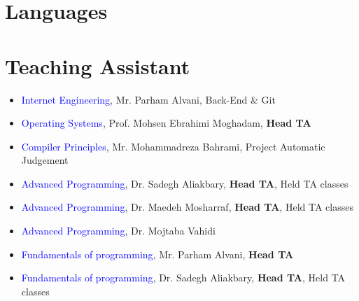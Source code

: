 \documentclass[11pt,a4paper,sans]{moderncv}
\begin{document}
\vspace{-1em}
\section{Languages}



\vspace{-1em}
\section{Teaching Assistant}
\begin{itemize}
\item \textcolor{blue}{Internet Engineering}, Mr. Parham Alvani, Back-End \& Git
\item \textcolor{blue}{Operating Systems}, Prof. Mohsen Ebrahimi Moghadam, \textbf{Head TA}
\item \textcolor{blue}{Compiler Principles}, Mr. Mohammadreza Bahrami, Project Automatic Judgement
\item \textcolor{blue}{Advanced Programming}, Dr. Sadegh Aliakbary, \textbf{Head TA}, Held TA classes
\item \textcolor{blue}{Advanced Programming}, Dr. Maedeh Mosharraf, \textbf{Head TA}, Held TA classes
\item \textcolor{blue}{Advanced Programming}, Dr. Mojtaba Vahidi
\item \textcolor{blue}{Fundamentals of programming}, Mr. Parham Alvani, \textbf{Head TA}
\item \textcolor{blue}{Fundamentals of programming}, Dr. Sadegh Aliakbary, \textbf{Head TA}, Held TA classes
\end{itemize}

\vspace{-0.55em}
\end{document}
